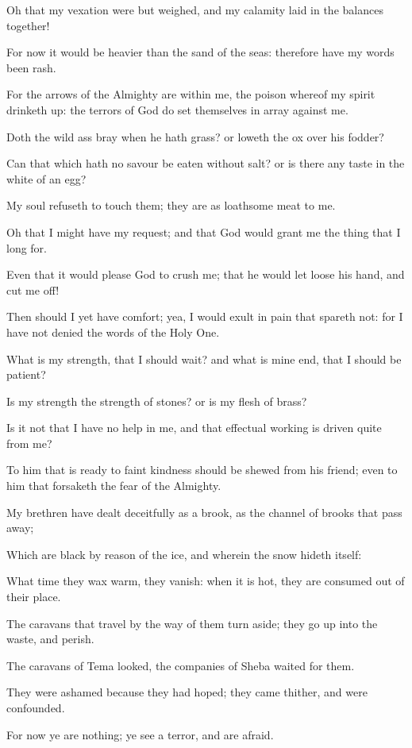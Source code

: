 \documentclass[12pt,oneside]{book}
\begin{document}
Oh that my vexation were but weighed, and my calamity laid in the balances together!

For now it would be heavier than the sand of the seas: therefore have my words been rash.

For the arrows of the Almighty are within me, the poison whereof my spirit drinketh up: the terrors of God do set themselves in array against me.

Doth the wild ass bray when he hath grass? or loweth the ox over his fodder?

Can that which hath no savour be eaten without salt? or is there any taste in the white of an egg?

My soul refuseth to touch them; they are as loathsome meat to me.

Oh that I might have my request; and that God would grant me the thing that I long for.

Even that it would please God to crush me; that he would let loose his hand, and cut me off!

Then should I yet have comfort; yea, I would exult in pain that spareth not: for I have not denied the words of the Holy One.

What is my strength, that I should wait? and what is mine end, that I should be patient?

Is my strength the strength of stones? or is my flesh of brass?

Is it not that I have no help in me, and that effectual working is driven quite from me?

To him that is ready to faint kindness should be shewed from his friend; even to him that forsaketh the fear of the Almighty.

My brethren have dealt deceitfully as a brook, as the channel of brooks that pass away;

Which are black by reason of the ice, and wherein the snow hideth itself:

What time they wax warm, they vanish: when it is hot, they are consumed out of their place.

The caravans that travel by the way of them turn aside; they go up into the waste, and perish.

The caravans of Tema looked, the companies of Sheba waited for them.

They were ashamed because they had hoped; they came thither, and were confounded.

For now ye are nothing; ye see a terror, and are afraid.
\end{document}
